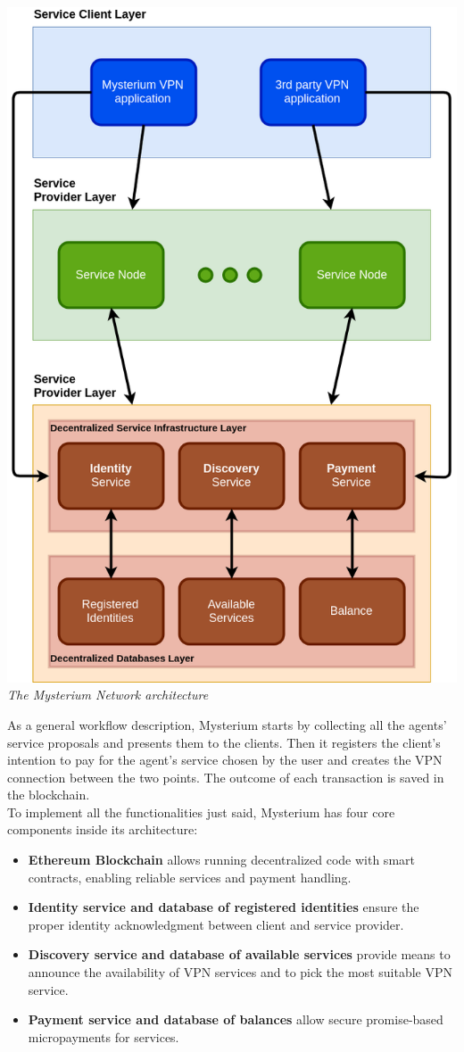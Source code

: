 \documentclass[12pt]{article}
\begin{document}
	\begin{center}
		\includegraphics[width=0.5\linewidth]{images/mysterium_architecture.png}\\
		\small{\textit{The Mysterium Network architecture}}
	\end{center}
	\bigbreak

	As a general workflow description, Mysterium starts by collecting all the agents' service proposals and presents them to the clients. Then it registers the client's intention to pay for the agent's service chosen by the user and creates the VPN connection between the two points. The outcome of each transaction is saved in the blockchain.\\
	
	\bigbreak
	To implement all the functionalities just said, Mysterium has four core components inside its architecture:
	\begin{itemize}
		\item \textbf{Ethereum Blockchain} allows running decentralized code with smart contracts, enabling reliable services and payment handling.
		\item \textbf{Identity service and database of registered identities} ensure the proper identity acknowledgment between client and service provider.
		\item \textbf{Discovery service and database of available services} provide means to announce the availability of VPN services and to pick the most suitable VPN service.
		\item \textbf{Payment service and database of balances} allow secure promise-based micropayments for services.
	\end{itemize}
\end{document}
